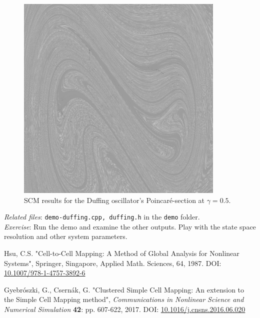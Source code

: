 \documentclass[11pt]{article}
\begin{document}
\begin{figure}[h]
	\centering
	\includegraphics[width=10cm]{fig/duffing.jpg}
	\caption{SCM results for the Duffing oscillator's Poincaré-section at $\gamma = 0.5$.}
\end{figure}

\noindent \emph{Related files}: \texttt{demo-duffing.cpp, duffing.h} in the \texttt{demo} folder.\\
\noindent \emph{Exercise}: Run the demo and examine the other outputs. Play with the state space resolution and other system parameters.

\begin{thebibliography}{99}
	
	 Hsu, C.S. "Cell-to-Cell Mapping: A Method of Global Analysis for Nonlinear Systems", Springer, Singapore, Applied Math. Sciences, 64, 1987. DOI: \href{https://doi.org/10.1007/978-1-4757-3892-6}{10.1007/978-1-4757-3892-6}
	
	 Gyebr\'oszki, G., Csern\'ak, G. "Clustered Simple Cell Mapping: An extension to the Simple Cell Mapping method", {\em Communications in Nonlinear Science and Numerical Simulation} \textbf{42}: pp. 607-622, 2017. DOI: \href{https://doi.org/10.1016/j.cnsns.2016.06.020}{10.1016/j.cnsns.2016.06.020}
	
\end{thebibliography}
\end{document}
